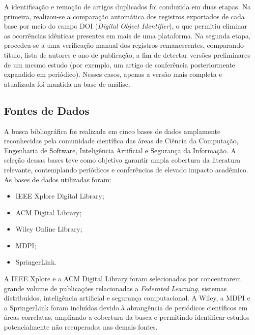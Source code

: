 \documentclass[
	12pt,				%
	openright,			%
	oneside,			%
	a4paper,			%
	english,			%
	french,				%
	spanish,			%
	brazil,				%
	]{abntex2}
\begin{document}
A identificação e remoção de artigos duplicados foi conduzida em duas etapas. Na primeira, realizou-se a comparação automática dos registros exportados de cada base por meio do campo DOI (\textit{Digital Object Identifier}), o que permitiu eliminar as ocorrências idênticas presentes em mais de uma plataforma. Na segunda etapa, procedeu-se a uma verificação manual dos registros remanescentes, comparando título, lista de autores e ano de publicação, a fim de detectar versões preliminares de um mesmo estudo (por exemplo, um artigo de conferência posteriormente expandido em periódico). Nesses casos, apenas a versão mais completa e atualizada foi mantida na base de análise.

\subsection{Fontes de Dados}

A busca bibliográfica foi realizada em cinco bases de dados amplamente reconhecidas pela comunidade científica das áreas de Ciência da Computação, Engenharia de Software, Inteligência Artificial e Segurança da Informação. A seleção dessas bases teve como objetivo garantir ampla cobertura da literatura relevante, contemplando periódicos e conferências de elevado impacto acadêmico. As bases de dados utilizadas foram:

\begin{itemize}
    \item IEEE Xplore Digital Library;
    \item ACM Digital Library;
    \item Wiley Online Library;
    \item MDPI;
    \item SpringerLink.
\end{itemize}

A IEEE Xplore e a ACM Digital Library foram selecionadas por concentrarem grande volume de publicações relacionadas a \textit{Federated Learning}, sistemas distribuídos, inteligência artificial e segurança computacional. A Wiley, a MDPI e a SpringerLink foram incluídas devido à abrangência de periódicos científicos em áreas correlatas, ampliando a cobertura da busca e permitindo identificar estudos potencialmente não recuperados nas demais fontes.
\end{document}
